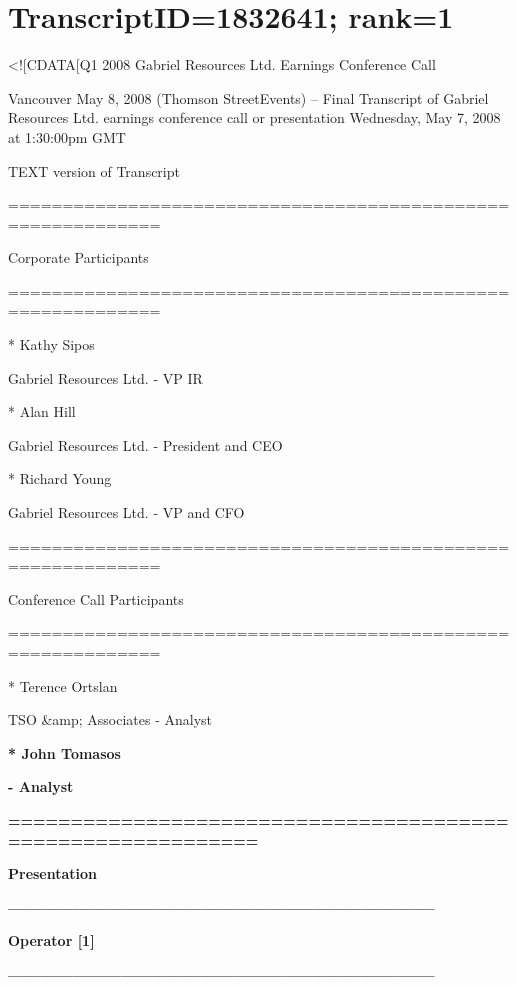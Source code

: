 \documentclass{article}
\begin{document}

\section*{TranscriptID=1832641; rank=1}

<![CDATA[Q1 2008 Gabriel Resources Ltd. Earnings Conference Call 

 

 Vancouver May 8, 2008 (Thomson StreetEvents) -- Final Transcript of Gabriel Resources Ltd. earnings conference call or presentation Wednesday, May 7, 2008 at 1:30:00pm GMT 

 

 TEXT version of Transcript 

 

 ============================================================ 

 Corporate Participants 

 ============================================================ 

 * Kathy Sipos 

 Gabriel Resources Ltd. - VP IR 

 * Alan Hill 

 Gabriel Resources Ltd. - President and CEO 

 * Richard Young 

 Gabriel Resources Ltd. - VP and CFO 

 

 ============================================================ 

 Conference Call Participants 

 ============================================================ 

 * Terence Ortslan 

 TSO \&amp; Associates - Analyst 

 \textbf{* John Tomasos} 

 \textbf{- Analyst} 

 

 \textbf{============================================================} 

 \textbf{Presentation} 

 \textbf{--------------------------------------------------------------------------------} 

 \textbf{Operator [1]} 

 \textbf{--------------------------------------------------------------------------------} 
\end{document}
